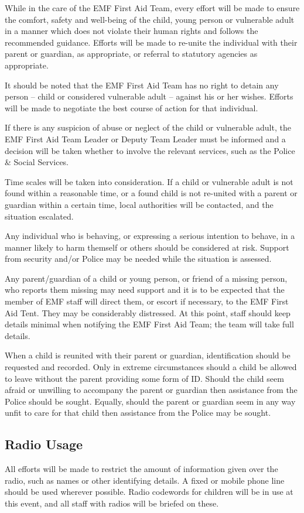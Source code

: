 While in the care of the EMF First Aid Team, every effort will be made to
ensure the comfort, safety and well-being of the child, young person or
vulnerable adult in a manner which does not violate their human rights and
follows the recommended guidance. Efforts will be made to re-unite the
individual with their parent or guardian, as appropriate, or referral to
statutory agencies as appropriate.

It should be noted that the EMF First Aid Team has no right to detain any
person -- child or considered vulnerable adult -- against his or her wishes.
Efforts will be made to negotiate the best course of action for that
individual.

If there is any suspicion of abuse or neglect of the child or vulnerable adult,
the EMF First Aid Team Leader or Deputy Team Leader must be informed and a
decision will be taken whether to involve the relevant services, such as the
Police \& Social Services.

Time scales will be taken into consideration. If a child or vulnerable adult is
not found within a reasonable time, or a found child is not re-united with a
parent or guardian within a certain time, local authorities will be contacted,
and the situation escalated.

Any individual who is behaving, or expressing a serious intention to behave, in
a manner likely to harm themself or others should be considered at risk.
Support from security and/or Police may be needed while the situation is
assessed.

Any parent/guardian of a child or young person, or friend of a missing person,
who reports them missing may need support and it is to be expected that the
member of EMF staff will direct them, or escort if necessary, to the EMF First
Aid Tent. They may be considerably distressed. At this point, staff should keep
details minimal when notifying the EMF First Aid Team; the team will take full
details.

When a child is reunited with their parent or guardian, identification should be
requested and recorded. Only in extreme circumstances should a child be
allowed to leave without the parent providing some form of ID. Should the child
seem afraid or unwilling to accompany the parent or guardian then assistance
from the Police should be sought. Equally, should the parent or guardian
seem in any way unfit to care for that child then assistance from the
Police may be sought.

\subsection{Radio Usage}
All efforts will be made to restrict the amount of information given over the
radio, such as names or other identifying details. A fixed or mobile phone line
should be used wherever possible. Radio codewords for children will be in
use at this event, and all staff with radios will be briefed on these.

